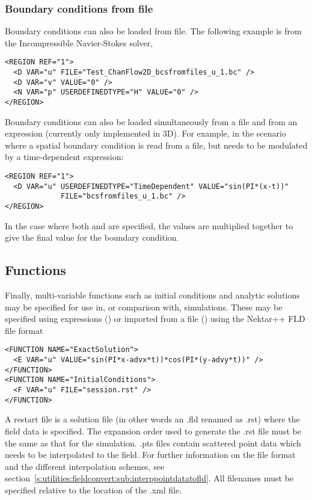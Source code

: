 \subsubsection{Boundary conditions from file}
Boundary conditions can also be loaded from file. The following example is from
the Incompressible Navier-Stokes solver,
\begin{lstlisting}[style=XMLStyle]
<REGION REF="1">
  <D VAR="u" FILE="Test_ChanFlow2D_bcsfromfiles_u_1.bc" />
  <D VAR="v" VALUE="0" />
  <N VAR="p" USERDEFINEDTYPE="H" VALUE="0" />
</REGION>
\end{lstlisting}

Boundary conditions can also be loaded simultaneously from a file and from an 
expression (currently only implemented in 3D).
For example, in the scenario where a spatial boundary 
condition is read from a file, but needs to be modulated by a time-dependent 
expression:
\begin{lstlisting}[style=XMLStyle]
<REGION REF="1">
  <D VAR="u" USERDEFINEDTYPE="TimeDependent" VALUE="sin(PI*(x-t))"
             FILE="bcsfromfiles_u_1.bc" />
</REGION>
\end{lstlisting}

In the case where both  and  are specified, the values
are multiplied together to give the final value for the boundary condition. 

\subsection{Functions}

Finally, multi-variable functions such as initial conditions and analytic
solutions may be specified for use in, or comparison with, simulations. These
may be specified using expressions () or imported from a file
() using the Nektar++ FLD file format

\begin{lstlisting}[style=XMLStyle]
<FUNCTION NAME="ExactSolution">
  <E VAR="u" VALUE="sin(PI*x-advx*t))*cos(PI*(y-advy*t))" />
</FUNCTION>
<FUNCTION NAME="InitialConditions">
  <F VAR="u" FILE="session.rst" />
</FUNCTION>
\end{lstlisting}

A restart file is a solution file (in other words an .fld renamed as .rst) where
the field data is specified. The expansion order used to generate the .rst file
must be the same as that for the simulation.
.pts files contain scattered point data which needs to be interpolated to the field.
For further information on the file format and the different interpolation schemes, see
section~\ref{s:utilities:fieldconvert:sub:interppointdatatofld}.
All filenames must be specified relative to the location of the .xml file.

